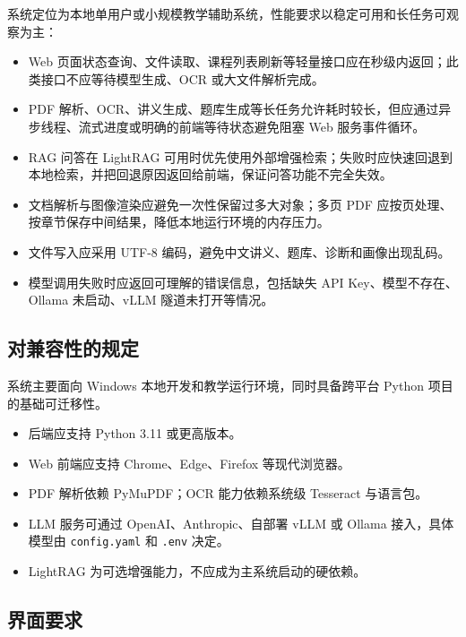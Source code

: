 \documentclass[UTF8,fontset=windows,zihao=-4,openany]{ctexrep}
\begin{document}
系统定位为本地单用户或小规模教学辅助系统，性能要求以稳定可用和长任务可观察为主：
\begin{itemize}
  \item Web 页面状态查询、文件读取、课程列表刷新等轻量接口应在秒级内返回；此类接口不应等待模型生成、OCR 或大文件解析完成。
  \item PDF 解析、OCR、讲义生成、题库生成等长任务允许耗时较长，但应通过异步线程、流式进度或明确的前端等待状态避免阻塞 Web 服务事件循环。
  \item RAG 问答在 LightRAG 可用时优先使用外部增强检索；失败时应快速回退到本地检索，并把回退原因返回给前端，保证问答功能不完全失效。
  \item 文档解析与图像渲染应避免一次性保留过多大对象；多页 PDF 应按页处理、按章节保存中间结果，降低本地运行环境的内存压力。
  \item 文件写入应采用 UTF-8 编码，避免中文讲义、题库、诊断和画像出现乱码。
  \item 模型调用失败时应返回可理解的错误信息，包括缺失 API Key、模型不存在、Ollama 未启动、vLLM 隧道未打开等情况。
\end{itemize}

\subsection{对兼容性的规定}

系统主要面向 Windows 本地开发和教学运行环境，同时具备跨平台 Python 项目的基础可迁移性。
\begin{itemize}
  \item 后端应支持 Python 3.11 或更高版本。
  \item Web 前端应支持 Chrome、Edge、Firefox 等现代浏览器。
  \item PDF 解析依赖 PyMuPDF；OCR 能力依赖系统级 Tesseract 与语言包。
  \item LLM 服务可通过 OpenAI、Anthropic、自部署 vLLM 或 Ollama 接入，具体模型由 \texttt{config.yaml} 和 \texttt{.env} 决定。
  \item LightRAG 为可选增强能力，不应成为主系统启动的硬依赖。
\end{itemize}

\subsection{界面要求}
\end{document}
